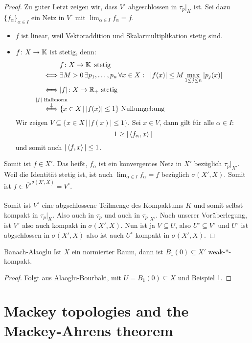 \documentclass{article}
\begin{document}
\begin{proof}
		Zu guter Letzt zeigen wir, dass $V^{\circ}$ abgeschlossen in $\tau_p|_{K}$ ist. Sei dazu $\{f_{\alpha}\}_{\alpha\in I}$ ein Netz in $V^{\circ}$ mit $\lim_{\alpha\in I}f_{\alpha}=f$.
		\begin{itemize}
			\item $f$ ist linear, weil Vektoraddition und Skalarmultiplikation stetig sind.
			\item $f\colon X\to \operatorname{\mathbb K}$ ist stetig, denn:
			\begin{align*}
			&f\colon X\to \KK\te{stetig}\\
			\iff& \exists M>0\,\exists p_1,\ldots,p_n\,\forall x\in X:\;\;|f(x)|\le M\max_{1\le j\le n}|p_j(x)|\\
			\iff & |f|\colon X\to \RR_+\te{stetig}\\
			\overset{\ms{|f|\te{Halbnorm}\\\downarrow}}{\iff}& \{x\in X\,|\, |f(x)|\le 1\} \te{Nullumgebung}
			\end{align*}
			Wir zeigen $V\subseteq \{x\in X\,|\, |f(x)|\le 1\}$. Sei $x\in V$, dann gilt für alle $\alpha\in I$:
			\[1\ge |\left\langle f_{\alpha},x\right\rangle|\]
			und somit auch $|\left\langle f,x\right\rangle|\le 1$.
		\end{itemize}
		Somit ist $f\in X'$. Das heißt, $f_{\alpha}$ ist ein konvergentes Netz in $X'$ bezüglich $\tau_p|_{X'}$. Weil die Identität stetig ist, ist auch $\lim_{\alpha\in I}f_{\alpha}=f$ bezüglich $\sigma(X',X)$. Somit ist $f\in \overline{V^{\circ}}^{\sigma(X',X)}=V^{\circ}$.\\
		\\
		Somit ist $V^{\circ}$ eine abgschlossene Teilmenge des Kompaktums $K$ und somit selbst kompakt in $\tau_p|_{K}$. Also auch in $\tau_p$ und auch in $\tau_p|_{X'}$. Nach unserer Vorüberlegung, ist $V^{\circ}$ also auch kompakt in $\sigma(X',X)$. Nun ist ja $V\subseteq U$, also $U^{\circ}\subseteq V^{\circ}$ und $U^{\circ}$ ist abgschlossen in $\sigma(X',X)$ also ist auch $U^{\circ}$ kompakt in $\sigma(X',X)$.		
	\end{proof}
	
	\begin{Kor}{Banach-Alaoglu}{}
		Ist $X$ ein normierter Raum, dann ist $B_1(0)\subseteq X'$ weak-$*$-kompakt.
	\end{Kor}
	
	\begin{proof}
		Folgt aus Alaoglu-Bourbaki, mit $U=B_1(0)\subseteq X$ und Beispiel \ref{}.
	\end{proof}
	
	
	\section{Mackey topologies and the Mackey-Ahrens theorem}
	
\end{document}
